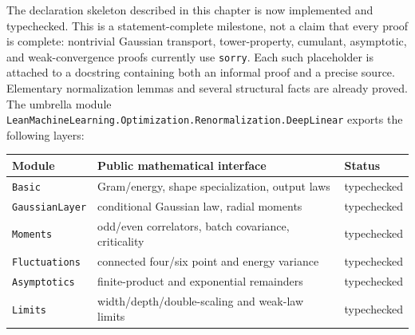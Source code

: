 The declaration skeleton described in this chapter is now implemented and typechecked.  This is a
statement-complete milestone, not a claim that every proof is complete: nontrivial Gaussian
transport, tower-property, cumulant, asymptotic, and weak-convergence proofs currently use
\texttt{sorry}.  Each such placeholder is attached to a docstring containing both an informal
proof and a precise source.  Elementary normalization lemmas and several structural facts are
already proved.  The umbrella module
\texttt{LeanMachineLearning.Optimization.Renormalization.DeepLinear} exports the following layers:
\begin{center}
\begin{tabular}{lll}
\toprule
Module & Public mathematical interface & Status \\
\midrule
\texttt{Basic} & Gram/energy, shape specialization, output laws & typechecked \\
\texttt{GaussianLayer} & conditional Gaussian law, radial moments & typechecked \\
\texttt{Moments} & odd/even correlators, batch covariance, criticality & typechecked \\
\texttt{Fluctuations} & connected four/six point and energy variance & typechecked \\
\texttt{Asymptotics} & finite-product and exponential remainders & typechecked \\
\texttt{Limits} & width/depth/double-scaling and weak-law limits & typechecked \\
\bottomrule
\end{tabular}
\end{center}

